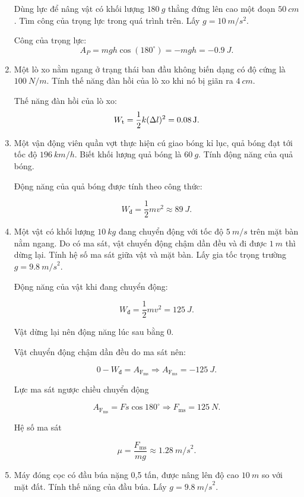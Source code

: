 \begin{enumerate}[label=\bfseries Câu \arabic*:]
	
	{
		Dùng lực để nâng vật có khối lượng $\SI{180}{g}$ thẳng đứng lên cao một đoạn $\SI{50}{cm}$. Tìm công của trọng lực trong quá trình trên. Lấy $g=\SI{10}{m/s^2}$.
	}
	
	\hideall
	{	
		Công của trọng lực:
		$$A_P = mgh\cos(180^\circ) = -mgh = \SI{-0.9}{J}.$$
	}
		\item {}
	
	
	{
		Một lò xo nằm ngang ở trạng thái ban đầu không biến dạng có độ cứng là $\SI{100}{N/m}$. Tính thế năng đàn hồi của lò xo khi nó bị giãn ra $\SI{4}{cm}$.
	}
	
	\hideall
	{	
		Thế năng đàn hồi của lò xo:
		$$W_\text t = \dfrac{1}{2} k (\Delta l)^2 = \SI{0.08}{J}.$$
	}
	\item {}
	
	
	{
		Một vận động viên quần vợt thực hiện cú giao bóng kỉ lục, quả bóng đạt tới tốc độ $\SI{196}{km/h}$. Biết khối lượng quả bóng là $\SI{60}{g}.$ Tính động năng của quả bóng.
	}
	
	\hideall
	{	
		Động năng của quả bóng được tính theo công thức:
		
		$$W_\text{đ} =\dfrac{1}{2}mv^2 \approx \SI{89}{J}.$$
	}
		\item {}
	
	
	{
		Một vật có khối lượng $\SI{10}{kg}$ đang chuyển động với tốc độ $\SI{5}{m/s}$ trên mặt bàn nằm ngang. Do có ma sát, vật chuyển động chậm dần đều và đi được $\SI{1}{m}$ thì dừng lại. Tính hệ số ma sát giữa vật và mặt bàn. Lấy gia tốc trọng trường $g = \SI{9,8}{m/s}^2.$
	}
	
	\hideall
	{	
		Động năng của vật khi đang chuyển động:
		
		$$W_\text{đ} = \dfrac{1}{2}mv^2 = \SI{125}{J}.$$
		
		Vật dừng lại nên động năng lúc sau bằng 0.
		
		Vật chuyển động chậm dần đều do ma sát nên:
		
		$$0- W_\text{đ} = A_{\text{F}_\text{ms}} \Rightarrow A_{\text{F}_\text{ms}} = - \SI{125}{J}.$$
		
		Lực ma sát ngược chiều chuyển động
		
		$$A_{\text{F}_\text{ms}} = Fs\cos 180^\circ \Rightarrow F_\text{ms} = \SI{125}{N}.$$
		
		Hệ số ma sát
		
		$$\mu = \dfrac{F_\text{ms}}{mg} \approx \SI{1,28}{m/s}^2.$$
	}
	\item {}
	
	
	{
		Máy đóng cọc có đầu búa nặng 0,5 tấn, được nâng lên độ cao $\SI{10}{m}$ so với mặt đất. Tính thế năng của đầu búa. Lấy $g = \SI{9,8}{m/s}^2$.
	}
	

\end{enumerate}
